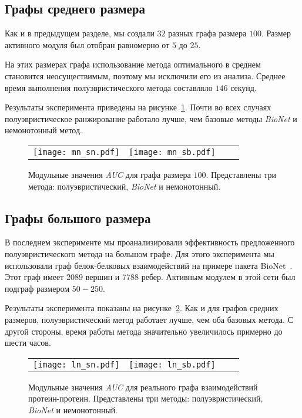 \subsection{Графы среднего размера}

Как и в предыдущем разделе, мы создали $32$ разных графа размера $100$.
Размер активного модуля был отобран равномерно от $5$ до $25$.

На этих размерах графа использование метода оптимального в среднем становится
неосуществимым, поэтому мы исключили его из анализа.  Среднее время выполнения
полуэвристического метода составляло $146$ секунд.

Результаты эксперимента приведены на рисунке~\ref{fig:med}.  Почти во всех
случаях полуэвристическое ранжирование работало лучше, чем базовые методы
\emph{BioNet} и немонотонный метод.

\begin{figure}
    \centering
    \begin{tabular}{@{}cccc@{}}
        \texttt{[image: mn\_sn.pdf]} &
        \texttt{[image: mn\_sb.pdf]}  
    \end{tabular}
    \caption{
        Модульные значения \emph{AUC} для графа размера $100$. Представлены три
        метода: полуэвристический, \emph{BioNet} и немонотонный.
    }%
    \label{fig:med}%
\end{figure}





\subsection{Графы большого размера}

В последнем эксперименте мы проанализировали эффективность предложенного
полуэвристического метода на большом графе. Для этого эксперимента мы
использовали граф белок-белковых взаимодействий на примере пакета
BioNet~\cite{Beisser2010}.  Этот граф имеет $2089$ вершин и $7788$ ребер.
Активным модулем в этой сети был подграф размером $50-250$.

Результаты эксперимента показаны на рисунке~\ref{fig:lar}. Как и для графов
средних размеров, полуэвристический метод  работает лучше, чем оба базовых
метода. С другой стороны, время работы метода значительно увеличилось примерно
до шести часов.

\begin{figure}
    \centering
    \begin{tabular}{@{}cccc@{}}
        \texttt{[image: ln\_sn.pdf]} &
        \texttt{[image: ln\_sb.pdf]}    
    \end{tabular}
    \caption{
        Модульные значения \emph{AUC} для реального графа взаимодействий
        протеин-протеин.  Представлены три методы: полуэвристический,
        \emph{BioNet} и немонотонный.
    }%
    \label{fig:lar}%
\end{figure}






